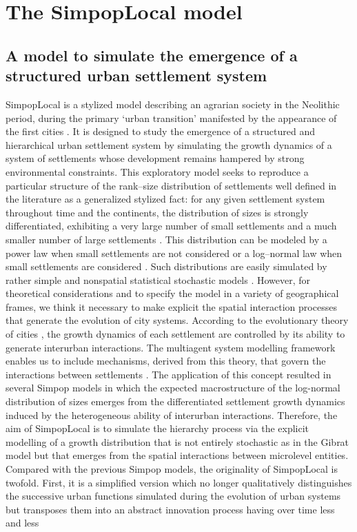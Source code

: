 \section{The SimpopLocal model}
\label{sec:simpoplocal}

\subsection{A model to simulate the emergence of a structured urban settlement system}
\label{subsec:simulate_structure}

SimpopLocal is a stylized model describing an agrarian society in the Neolithic period, during the primary ‘urban transition’ manifested by the appearance of the first cities \autocite{Schmitt2014}. It is designed to study the emergence of a structured and hierarchical urban settlement system by simulating the growth dynamics of a system of settlements whose development remains hampered by strong environmental constraints. This exploratory model seeks to reproduce a particular structure of the rank–size distribution of settlements well defined in the literature as a generalized stylized fact: for any given settlement system throughout time and the continents, the distribution of sizes is strongly differentiated, exhibiting a very large number of small settlements and a much smaller number of large settlements \autocites{Archaeomedes1998,Berry1964a,Fletcher1986,Liu1996}. This distribution can be modeled by a power law when small settlements are not considered or a log–normal law when small settlements are considered \autocites{Favaro2011, Robston1973}. Such distributions are easily simulated by rather simple and nonspatial statistical stochastic models \autocites{Gibrat1931,Simon1955}. However, for theoretical considerations and to specify the model in a variety of geographical frames, we think it necessary to make explicit the spatial interaction processes that generate the evolution of city systems. According to the evolutionary theory of cities \autocite{Pumain2009}, the growth dynamics of each settlement are controlled by its ability to generate interurban inter­actions. The multiagent system modelling framework enables us to include mechanisms, derived from this theory, that govern the interactions between settlements \autocites{Bretagnolle2006, Sanders2013}. The application of this concept resulted in several Simpop models \autocites{Bretagnolle2010, Bura1996,Pumain2009, Sanders1997} in which the expected macrostructure of the log-normal distribution of sizes emerges from the differentiated settlement growth dynamics induced by the heterogeneous ability of interurban interactions. Therefore, the aim of SimpopLocal is to simulate the hierarchy process via the explicit modelling of a growth distribution that is not entirely stochastic as in the Gibrat model \autocite{Gibrat1931} but that emerges from the spatial interactions between microlevel entities. Compared with the previous Simpop models, the originality of SimpopLocal is twofold. First, it is a simplified version which no longer qualitatively distinguishes the successive urban functions simulated during the evolution of urban systems but transposes them into an abstract innovation process having over time less and less 